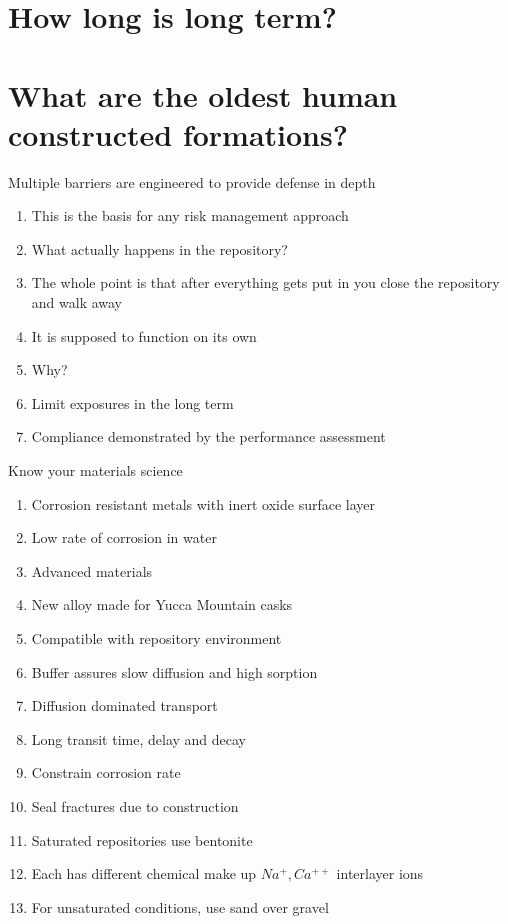 \documentclass[aspectratio=1610,pdftex,dvipsnames,compress,xcolor={dvipsnames}]{beamer}
\begin{document}
\section{How long is long term?}
\section{What are the oldest human constructed formations?}


\addtocounter{framenumber}{-2} 
\begin{frame}{Multiple barriers are engineered to provide defense in depth}
    \begin{enumerate}[series=outerlist,topsep=0pt,itemsep=21pt,leftmargin=*,label=(\arabic*)]
        \item[]This is the basis for any risk management approach
        \item[]What actually happens in the repository?
        \item[]The whole point is that after everything gets put in you close the repository and walk away
        \item[]It is supposed to function on its own
        \item[]Why?
        \item[]Limit exposures in the long term
        \item[]Compliance demonstrated by the performance assessment
    \end{enumerate}
\end{frame}


\begin{frame}{Know your materials science}
    \begin{enumerate}[series=outerlist,topsep=0pt,itemsep=3pt,leftmargin=*,label=(\arabic*)]
        \item[]Corrosion resistant metals with inert oxide surface layer
        \item[]Low rate of corrosion in water
        \item[]Advanced materials
        \item[]New alloy made for Yucca Mountain casks
        \item[]Compatible with repository environment
        \item[]Buffer assures slow diffusion and high sorption
        \item[]Diffusion dominated transport
        \item[]Long transit time, delay and decay
        \item[]Constrain corrosion rate
        \item[]Seal fractures due to construction
        \item[]Saturated repositories use bentonite
        \item[]Each has different chemical make up $Na^+,Ca^{++}$ interlayer ions
        \item[]For unsaturated conditions, use sand over gravel
    \end{enumerate}
\end{frame}
\end{document}
